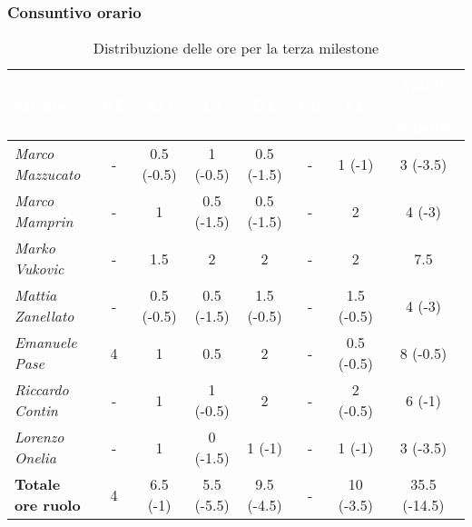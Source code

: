 \subsubsection{Consuntivo orario}
\begin{table}[H]
    \renewcommand\arraystretch{1.5}
    \small
    \centering
    \begin{adjustwidth}{-1.15cm}{}
    \begin{tabular}{|l|c|c|c|c|c|c|c|}
    \hline
    \rowcolor[HTML]{036400}
    \textcolor{white}{\textbf{Membro}} & \multicolumn{1}{c|}{\textcolor{white}{\textbf{RE}}} & \multicolumn{1}{c|}{\textcolor{white}{\textbf{AM}}} & \multicolumn{1}{c|}{\textcolor{white}{\textbf{AN}}} & \multicolumn{1}{c|}{\textcolor{white}{\textbf{PT}}} & \multicolumn{1}{c|}{\textcolor{white}{\textbf{PR}}} & \multicolumn{1}{c|}{\textcolor{white}{\textbf{VE}}} & \multicolumn{1}{c|}{\textcolor{white}{\textbf{Totale ore persona}}} \\ \hline
    \rowcolor[HTML]{EFEFEF}\textit{Marco Mazzucato}  & -    & 0.5 (-0.5)     & 1 (-0.5)  & 0.5 (-1.5)   & - & 1 (-1)        & 3 (-3.5)       \\ \hline
    \rowcolor[HTML]{C0C0C0}\textit{Marco Mamprin}    & -    & 1            & 0.5 (-1.5)    & 0.5 (-1.5)   & - & 2             & 4 (-3)           \\ \hline
    \rowcolor[HTML]{EFEFEF}\textit{Marko Vukovic}    & -    & 1.5          & 2           & 2          & - & 2             & 7.5              \\ \hline
    \rowcolor[HTML]{C0C0C0}\textit{Mattia Zanellato} & -    & 0.5 (-0.5)     & 0.5 (-1.5)    & 1.5 (-0.5)   & - & 1.5 (-0.5)      & 4 (-3)           \\ \hline
    \rowcolor[HTML]{EFEFEF}\textit{Emanuele Pase}    & 4    & 1            & 0.5         & 2          & - & 0.5 (-0.5)      & 8 (-0.5)       \\ \hline
    \rowcolor[HTML]{C0C0C0}\textit{Riccardo Contin}  & -    & 1            & 1 (-0.5)  & 2          & - & 2 (-0.5)    & 6 (-1)           \\ \hline
    \rowcolor[HTML]{EFEFEF}\textit{Lorenzo Onelia}   & -    & 1            & 0 (-1.5)  & 1 (-1)     & - & 1 (-1)        & 3 (-3.5)       \\ \hline
    \rowcolor[HTML]{C0C0C0}\textbf{Totale ore ruolo} & 4    & 6.5 (-1)     & 5.5 (-5.5)   & 9.5 (-4.5)  & - & 10 (-3.5)   & 35.5 (-14.5)       \\ \hline
    \end{tabular}
    \end{adjustwidth}
    \caption{Distribuzione delle ore per la terza milestone}
\end{table}

